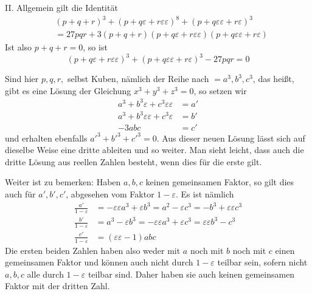 II. Allgemein gilt die Identität
\[
\begin{aligned}
&(p+q+r)^3+(p+q\varepsilon+r\varepsilon\varepsilon)^8+(p+q\varepsilon\varepsilon+r\varepsilon)^3\\
&=27pqr+3(p+q+r)(p+q\varepsilon+r\varepsilon\varepsilon)(p+q\varepsilon\varepsilon+r\varepsilon)
\end{aligned}
\]
Ist also $p+q+r=0$, so ist
\[
(p+q\varepsilon+r\varepsilon\varepsilon)^3+(p+q\varepsilon\varepsilon+r\varepsilon)^3-27pqr=0
\]

Sind hier $p,q,r,$ selbst Kuben, nämlich der Reihe nach $=a^3,b^3,c^3$, das heißt, gibt es eine Lösung der Gleichung $x^3+y^3+z^3=0$, so setzen wir
\[
\begin{aligned}
a^3+b^3\varepsilon+c^3\varepsilon\varepsilon&=a'\\
a^3+b^3\varepsilon\varepsilon+c^3\varepsilon&=b'\\
-3abc&=c'
\end{aligned}
\]
und erhalten ebenfalls $a'^3+b'^3+c'^3=0$. Aus dieser neuen Lösung lässt sich auf dieselbe Weise eine dritte ableiten und so weiter. Man sieht leicht, dass auch die dritte Lösung aus reellen Zahlen besteht, wenn dies für die erste gilt.

Weiter ist zu bemerken: Haben $a,b,c$ keinen gemeinsamen Faktor, so gilt dies auch für $a',b',c'$, abgesehen vom Faktor $1-\varepsilon$. Es ist nämlich
\[
\begin{aligned}
\frac{a'}{1-\varepsilon}&=-\varepsilon\varepsilon a^3+\varepsilon b^3=a^2-\varepsilon c^3=-b^3+\varepsilon\varepsilon c^3\\
\frac{b'}{1-\varepsilon}&=a^3-\varepsilon b^3=-\varepsilon\varepsilon a^3+\varepsilon c^3=\varepsilon\varepsilon b^3-c^3\\
\frac{c'}{1-\varepsilon}&=(\varepsilon\varepsilon-1)abc
\end{aligned}
\]
Die ersten beiden Zahlen haben also weder mit $a$ noch mit $b$ noch mit $c$ einen gemeinsamen Faktor und können auch nicht durch $1-\varepsilon$ teilbar sein, sofern nicht $a,b,c$
%
alle durch $1-\varepsilon$ teilbar sind. Daher haben sie auch keinen gemeinsamen Faktor mit der dritten Zahl.

